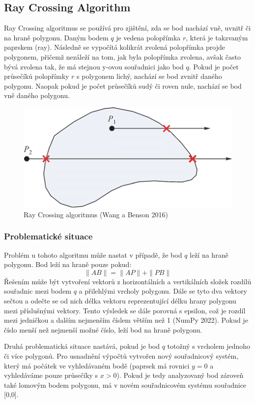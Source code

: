 \documentclass{article}
\begin{document}
\begin{spacing}{1.5}
\subsection{Ray Crossing Algorithm}
Ray Crossing algoritmus se používá pro zjištění, zda se bod nachází vně, uvnitř či na hraně polygonu. Daným bodem $q$  je vedena polopřímka $r$, která je takzvaným paprskem (ray). Následně se vypočítá kolikrát zvolená polopřímka projde polygonem, přičemž nezáleží na tom, jak byla polopřímka zvolena, avšak často bývá zvolena tak, že má stejnou y-ovou souřadnici jako bod $q$. Pokud je počet průsečíků polopřímky $r$ s polygonem lichý, nachází se bod zvnitř daného polygonu. Naopak pokud je počet průsečíků sudý či roven nule, nachází se bod vně daného polygonu.

\begin{figure}[h]
    \centering
    \includegraphics[width=0.7\linewidth]{images/ray.png}
    \caption{Ray Crossing algoritmus (Wang a Benson 2016)}
    \label{fig:enter-label}
\end{figure}

\subsubsection{Problematické situace}
Problém u tohoto algoritmu může nastat v případě, že bod $q$ leží na hraně polygonu. Bod leží na hraně pouze pokud:
$$\|AB\| = \|AP\| + \|PB\|$$
Řešením může být vytvoření vektorů z horizontálních a vertikálních složek rozdílů souřadnic mezi bodem $q$ a přilehlými vrcholy polygonu. Dále se tyto dva vektory sečtou a odečte se od nich délka vektoru reprezentující délku hrany polygonu mezi příslušnými vektory. Tento výsledek se dále porovná s epsilon, což je rozdíl mezi jedničkou a dalším nejmenším číslem větším než 1 (NumPy 2022). Pokud je číslo menší než nejmenší možné číslo, leží bod na hraně polygonu.

Druhá problematická situace nastává, pokud je bod $q$ totožný s vrcholem jednoho či více polygonů. Pro usnadnění výpočtů vytvořen nový souřadnicový systém, který má počátek ve vyhledávaném bodě (paprsek má rovnici $y = 0$ a vyhledáváme pouze průsečíky s $x>0$). Pokud je tedy analyzovaný bod zároveň také lomovým bodem polygonu, má v novém souřadnicovém systému souřadnice [0,0].


\end{spacing}
\end{document}

